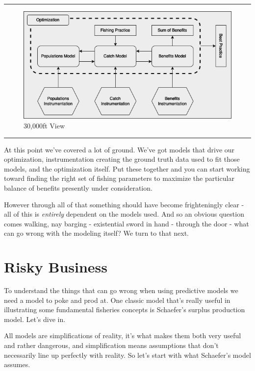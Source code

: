 \documentclass[11pt,a5paper]{book}
\begin{document}
\noindent \rule{\textwidth}{0.5pt} 
\begin{figure}[h!] 
  \includegraphics[width=\linewidth]{drawings/high_level.png}
  \caption{30,000ft View}
  \label{fig:high_level}
\end{figure}
\newline
\rule{\textwidth}{0.5pt} 
\vspace{5pt}

At this point we've covered a lot of ground. We've got models that drive our optimization, instrumentation creating the ground truth data used to fit those models, and the optimization itself. Put these together and you can start working toward finding the right set of fishing parameters to maximize the particular balance of benefits presently under consideration. 
\newline

However through all of that something should have become frighteningly clear - all of this is \textit{entirely} dependent on the models used. And so an obvious question comes walking, nay barging - existential sword in hand - through the door - what can go wrong with the modeling itself? We turn to that next. 
\newpage

\chapter{Risky Business}
To understand the things that can go wrong when using predictive models we need a model to poke and prod at. One classic model that's really useful in illustrating some fundamental fisheries concepts is Schaefer's surplus production model. Let's dive in.
\newline

All models are simplifications of reality, it's what makes them both very useful and rather dangerous, and simplification means assumptions that don't necessarily line up perfectly with reality. So let's start with what Schaefer's model assumes. 
\newline
\end{document}
